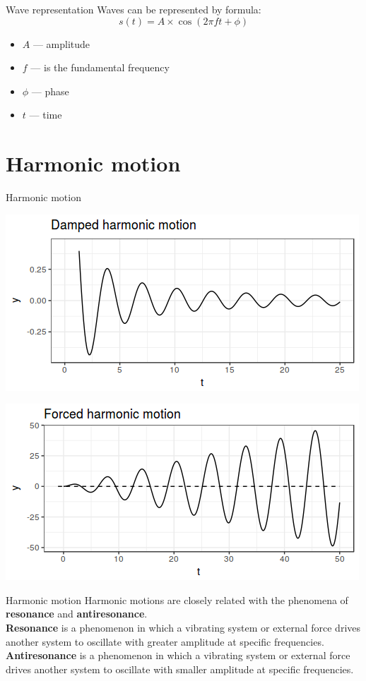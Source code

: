 \begin{frame}{Wave representation}
Waves can be represented by formula:
$$s(t) = A \times \cos(2\pi ft+\phi)$$
\begin{itemize}
\item $A$ --- amplitude
\item $f$ --- is the fundamental frequency
\item $\phi$ --- phase
\item $t$ --- time
\end{itemize}
\end{frame}

\section{Harmonic motion}
\begin{frame}{Harmonic motion}
\begin{center}
\includegraphics[width=0.7\linewidth]{09-Damped-hm.png}
\end{center}
\begin{center}
\includegraphics[width=0.7\linewidth]{10-Forced-hm.png}
\end{center}
\end{frame}

\begin{frame}{Harmonic motion}
Harmonic motions are closely related with the phenomena of \textbf{resonance} and \textbf{antiresonance}. \medskip\\
\textbf{Resonance} is a phenomenon in which a vibrating system or external force drives another system to oscillate with greater amplitude at specific frequencies.\medskip\\
\textbf{Antiresonance} is a phenomenon in which a vibrating system or external force drives another system to oscillate with smaller amplitude at specific frequencies.
\end{frame}

